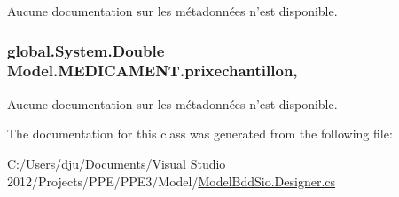 Aucune documentation sur les métadonnées n'est disponible. 

\hypertarget{class_model_1_1_m_e_d_i_c_a_m_e_n_t_a58b900226ac1992ee6b3f996c667e51a}{
\subsubsection[{prixechantillon}]{\setlength{\rightskip}{0pt plus 5cm}global.\-System.\-Double Model.\-M\-E\-D\-I\-C\-A\-M\-E\-N\-T.\-prixechantillon\hspace{0.3cm}{\ttfamily [get]}, {\ttfamily [set]}}}\label{class_model_1_1_m_e_d_i_c_a_m_e_n_t_a58b900226ac1992ee6b3f996c667e51a}


Aucune documentation sur les métadonnées n'est disponible. 



The documentation for this class was generated from the following file\-:\begin{DoxyCompactItemize}
\item 
C\-:/\-Users/dju/\-Documents/\-Visual Studio 2012/\-Projects/\-P\-P\-E/\-P\-P\-E3/\-Model/\hyperlink{_model_bdd_sio_8_designer_8cs}{Model\-Bdd\-Sio.\-Designer.\-cs}\end{DoxyCompactItemize}
